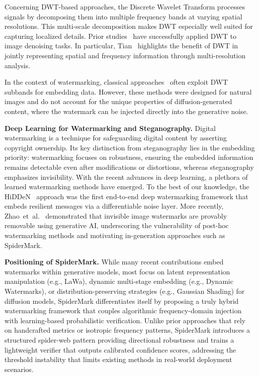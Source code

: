 \documentclass[lettersize,journal,review]{IEEEtran}
\begin{document}
Concerning DWT-based approaches, the Discrete Wavelet Transform processes signals 
by decomposing them into multiple frequency bands at varying spatial resolutions. 
This multi-scale decomposition makes DWT especially well suited for capturing 
localized details. Prior studies~\cite{mohideen2008image, pimpalkhute2021digital} have 
successfully applied DWT to image denoising tasks. In particular, 
Tian~\cite{tian2023multi} highlights the benefit of DWT in jointly representing 
spatial and frequency information through multi-resolution analysis.

In the context of watermarking, classical approaches~\cite{barni2001improved,raval2003discrete,shensa2002discrete,tao2004robust} often exploit DWT subbands for embedding 
data. However, these methods were designed for natural images and do not account for 
the unique properties of diffusion-generated content, where the watermark can be 
injected directly into the generative noise.

\noindent\textbf{Deep Learning for Watermarking and Steganography.}
Digital watermarking is a technique for safeguarding digital content by asserting 
copyright ownership. Its key distinction from steganography lies in the embedding 
priority: watermarking focuses on robustness, ensuring the embedded information 
remains detectable even after modifications or distortions, whereas steganography 
emphasizes invisibility. With the recent advances in deep learning, a plethora of 
learned watermarking methods have emerged. To the best of our knowledge, the 
HiDDeN~\cite{zhu2018hidden} approach was the first end-to-end deep watermarking 
framework that embeds resilient messages via a differentiable noise layer. 
More recently, Zhao~et~al.~\cite{zhao2024invisible} demonstrated that invisible 
image watermarks are provably removable using generative AI, underscoring the 
vulnerability of post-hoc watermarking methods and motivating in-generation 
approaches such as SpiderMark.

\noindent\textbf{Positioning of SpiderMark.}
While many recent contributions embed watermarks within generative models, most focus 
on latent representation manipulation (e.g., LaWa), dynamic multi-stage embedding 
(e.g., Dynamic Watermarks), or distribution-preserving strategies (e.g., Gaussian 
Shading) for diffusion models, SpiderMark differentiates itself by proposing a truly 
hybrid watermarking framework that couples algorithmic frequency-domain injection with 
learning-based probabilistic verification. Unlike prior approaches that rely on 
handcrafted metrics or isotropic frequency patterns, SpiderMark introduces a structured 
spider-web pattern providing directional robustness and trains a lightweight verifier 
that outputs calibrated confidence scores, addressing the threshold instability that 
limits existing methods in real-world deployment scenarios.
\end{document}
